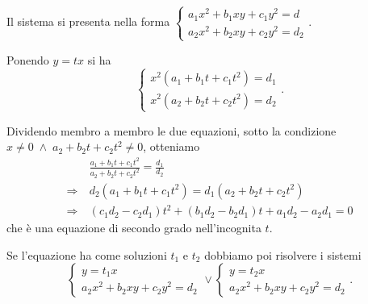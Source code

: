 Il sistema si presenta nella forma $\left\{\begin{array}{l}{a_1x^2+b_1xy+c_1y^2=d}\\{a_2x^2+b_2xy+c_2y^2=d_2}\end{array}\right.$.

Ponendo $y=tx$ si ha 
\[\left\{\begin{array}{l}{x^2(a_1+b_1t+c_1t^2)=d_1}\\{x^2(a_2+b_2t+c_2t^2)=d_2}\end{array}\right..\]

Dividendo membro a membro le due equazioni, sotto la condizione $x\neq 0\;\wedge\; a_2+b_2t+c_2t^2\neq 0$, otteniamo 
\begin{align*}
&\frac{a_1+b_1t+c_1t^2}{a_2+b_2t+c_2t^2}=\frac {d_1}{d_2}\\
\Rightarrow\: & d_2(a_1+b_1t+c_1t^2)=d_1(a_2+b_2t+c_2t^2)\\
\Rightarrow\: & (c_1d_2-c_2d_1)t^2+(b_1d_2-b_2d_1)t+a_1d_2-a_2d_1=0 
\end{align*}
che è una equazione di secondo grado nell'incognita $t$.

Se l'equazione ha come soluzioni $t_1$ e $t_2$ dobbiamo poi risolvere i sistemi \[ \left\{\begin{array}{l}y=t_1x \\a_2x^2+b_2xy+c_2y^2=d_2 \end{array}\right.\vee\left\{\begin{array}{l}y=t_2x \\a_2x^2+b_2xy+c_2y^2=d_2 \end{array}\right.. \]

